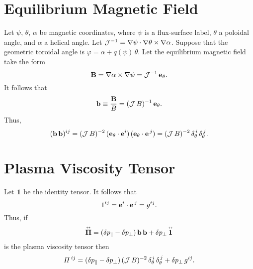 \documentclass[12pt,prb,aps,notitlepage]{revtex4-1}
\newcommand{\bPi}{\mbox{\boldmath$\Pi$}}
\newcommand{\smalltensor}[1]{\overset{\text{\tiny$\leftrightarrow$}}{#1}}
\begin{document}
\section{Equilibrium Magnetic Field}
Let $\psi$, $\theta$, $\alpha$ be magnetic coordinates, where $\psi$ is a flux-surface label, $\theta$ a poloidal angle, and $\alpha$
a helical angle. Let ${\cal  J}^{-1}= \nabla\psi\cdot\nabla\theta\times \nabla\alpha$. Suppose that the geometric toroidal angle is $\varphi = \alpha+ q(\psi)\,\theta$. Let the equilibrium magnetic field
take the form
\begin{equation}\label{e44}
{\bf B} =  \nabla\alpha\times\nabla\psi={\cal J}^{-1}\,{\bf e}_\theta.
\end{equation}
It follows that 
\begin{equation}
{\bf b} \equiv \frac{{\bf B}}{B}= ({\cal J}\,B)^{-1}\,{\bf e}_\theta.
\end{equation}
Thus,
\begin{equation}
({\bf b}\,{\bf b})^{ij}= ({\cal J}\,B)^{-2} \,({\bf e}_\theta\cdot{\bf e}^i)\,({\bf e}_\theta\cdot{\bf e}^{\,j})=  ({\cal J}\,B)^{-2} \,\delta_\theta^{\,i}\,\delta_\theta^{\,j}.
\end{equation}

\section{Plasma Viscosity Tensor}
Let ${\bf 1}$ be the identity tensor. It follows that
\begin{equation}
1^{ij}= {\bf e}^i\cdot{\bf e}^{\,j} = g^{ij}.
\end{equation}
Thus, if 
\begin{equation}
\smalltensor{\bPi}= (\delta p_\parallel-\delta p_\perp)\,{\bf b}\,{\bf b} + \delta p_\perp\,\smalltensor{\bf 1}
\end{equation}
is the plasma viscosity tensor then
\begin{equation}\label{e48}
{\mit\Pi}^{\,ij} = (\delta p_\parallel-\delta p_\perp)\,({\cal J}\,B)^{-2} \,\delta_\theta^{\,i}\,\delta_\theta^{\,j} +\delta p_\perp\,g^{ij}.
\end{equation}
\end{document}
